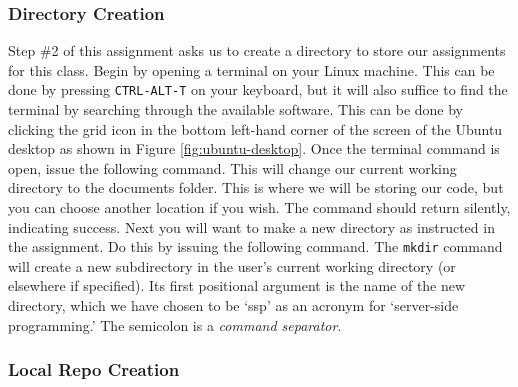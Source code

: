 \documentclass{article}
\begin{document}
\subsubsection{Directory Creation}

Step \#2 of this assignment asks us to create a directory to store our
assignments for this class. Begin by opening a terminal on your Linux machine.
This can be done by pressing \verb|CTRL-ALT-T| on your keyboard, but it will
also suffice to find the terminal by searching through the available software.
This can be done by clicking the grid icon in the bottom left-hand corner of the
screen of the Ubuntu desktop as shown in Figure \ref{fig:ubuntu-desktop}.  Once
the terminal command is open, issue the following command.
%
%
This will change our current working directory to the documents folder.  This is
where we will be storing our code, but you can choose another location if you
wish. The command should return silently, indicating success. Next you will want
to make a new directory as instructed in the assignment. Do this by issuing the
following command.
%
%
The \verb|mkdir| command will create a new subdirectory in the user's current
working directory (or elsewhere if specified). Its first positional argument is
the name of the new directory, which we have chosen to be `ssp' as an acronym
for `server-side programming.' The semicolon is a \emph{command separator}.

\subsubsection{Local Repo Creation}
\end{document}
